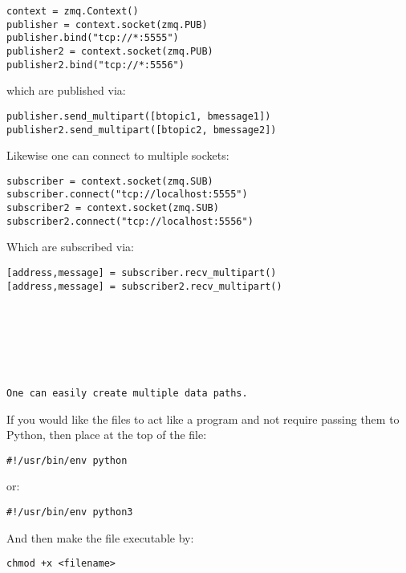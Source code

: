 \begin{verbatim}
context = zmq.Context()
publisher = context.socket(zmq.PUB)
publisher.bind("tcp://*:5555")
publisher2 = context.socket(zmq.PUB)
publisher2.bind("tcp://*:5556")
\end{verbatim}

which are published via:

\begin{verbatim}
publisher.send_multipart([btopic1, bmessage1])
publisher2.send_multipart([btopic2, bmessage2])
\end{verbatim}

Likewise one can connect to multiple sockets:

\begin{verbatim}
subscriber = context.socket(zmq.SUB)
subscriber.connect("tcp://localhost:5555")
subscriber2 = context.socket(zmq.SUB)
subscriber2.connect("tcp://localhost:5556")
\end{verbatim}

Which are subscribed via:

\begin{verbatim}
[address,message] = subscriber.recv_multipart()
[address,message] = subscriber2.recv_multipart()







One can easily create multiple data paths.
\end{verbatim}

If you would like the files to act like a program and not require
passing them to Python, then place at the top of the file:

\begin{verbatim}
#!/usr/bin/env python
\end{verbatim}

or:

\begin{verbatim}
#!/usr/bin/env python3
\end{verbatim}

And then make the file executable by:

\begin{verbatim}
chmod +x <filename>
\end{verbatim}
